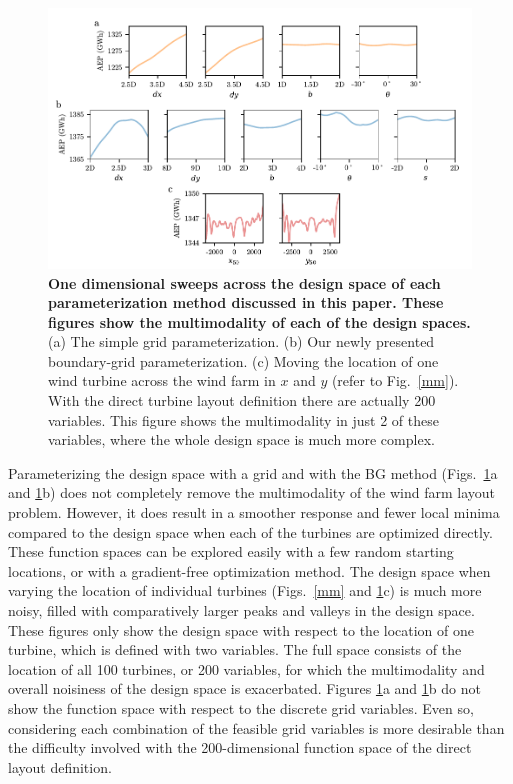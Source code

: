 \documentclass[wes, manuscript]{copernicus}
\providecommand{\DIFaddbeginFL}{} %
\providecommand{\DIFaddendFL}{} %
\providecommand{\DIFdelbeginFL}{} %
\providecommand{\DIFdelendFL}{} %
\begin{document}
\begin{figure}
\centering
\DIFdelbeginFL %
\DIFdelendFL \DIFaddbeginFL \includegraphics{paper-figures/multimodalityR1.pdf}
\DIFaddendFL \caption{ \textbf{One dimensional sweeps across the design space of each parameterization method discussed in this paper. These figures show the multimodality of each of the design spaces.} (a) The simple grid parameterization. (b) Our newly presented boundary-grid parameterization. (c) Moving the location of one wind turbine across the wind farm in $x$ and $y$ (refer to Fig.~\ref{mm}). With the direct turbine layout definition there are actually 200 variables. This figure shows the multimodality in just 2 of these variables, where the whole design space is much more complex.}
\label{multimodality}
\end{figure}

Parameterizing the design space with a grid and with the BG method (Figs.~\ref{multimodality}a and \ref{multimodality}b) does not completely remove the multimodality of the wind farm layout problem. However, it does result in a smoother response and fewer local minima compared to the design space when each of the turbines are optimized directly. These function spaces can be explored easily with a few random starting locations, or with a gradient-free optimization method. 
The design space when varying the location of individual turbines (Figs.~\ref{mm} and \ref{multimodality}c) is much more noisy, filled with comparatively larger peaks and valleys in the design space. These figures only show the design space with respect to the location of one turbine, which is defined with two variables. The full space consists of the location of all 100 turbines, or 200 variables, for which the multimodality and overall noisiness of the design space is exacerbated.
%
Figures \ref{multimodality}a and \ref{multimodality}b do not show the function space with respect to the discrete grid variables. Even so, considering each combination of the feasible grid variables is more desirable than the difficulty involved with the 200-dimensional function space of the direct layout definition.
\end{document}
